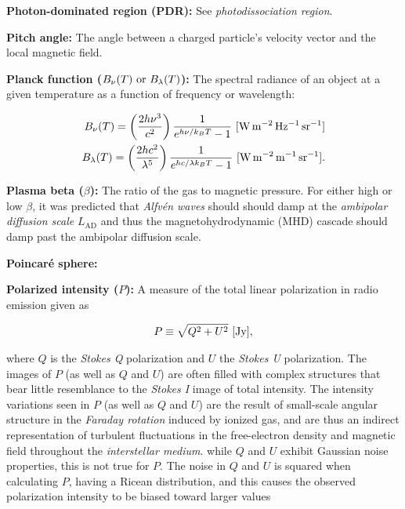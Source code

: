 \documentclass[a4paper,10pt]{article}
\begin{document}
{\noindent}\textbf{Photon-dominated region (PDR):} See \textit{photodissociation region}.

{\noindent}\textbf{Pitch angle:} The angle between a charged particle's velocity vector and the local magnetic field.

{\noindent}\textbf{Planck function ($B_\nu(T)~{\rm or}~B_\lambda(T)$):} The spectral radiance of an object at a given temperature as a function of frequency or wavelength:

\begin{align*}
    B_\nu(T) = \left(\frac{2h\nu^3}{c^2}\right) \frac{1}{e^{h\nu/k_BT}-1} ~ [{\rm W\,m^{-2}\,Hz^{-1}\,sr^{-1}}] \\
    B_\lambda(T) = \left(\frac{2hc^2}{\lambda^5}\right) \frac{1}{e^{hc/\lambda k_BT}-1} ~ [{\rm W\,m^{-2}\,m^{-1}\,sr^{-1}}].
\end{align*}

{\noindent}\textbf{Plasma beta ($\beta$):} The ratio of the gas to magnetic pressure. For either high or low $\beta$, it was predicted that \textit{Alfv\'en waves} should should damp at the \textit{ambipolar diffusion scale} $L_\mathrm{AD}$ and thus the magnetohydrodynamic (MHD) cascade should damp past the ambipolar diffusion scale.

{\noindent}\textbf{Poincar\'e sphere:}

{\noindent}\textbf{Polarized intensity ($P$):} A measure of the total linear polarization in radio emission given as

\begin{align*}
    P\equiv\sqrt{Q^2+U^2} ~ [{\rm Jy}],
\end{align*}

{\noindent}where $Q$ is the \textit{Stokes Q} polarization and $U$ the \textit{Stokes U} polarization. The images of $P$ (as well as $Q$ and $U$) are often filled with complex structures that bear little resemblance to the \textit{Stokes I} image of total intensity. The intensity variations seen in $P$ (as well as $Q$ and $U$) are the result of small-scale angular structure in the \textit{Faraday rotation} induced by ionized gas, and are thus an indirect representation of turbulent fluctuations in the free-electron density and magnetic field throughout the \textit{interstellar medium}. while $Q$ and $U$ exhibit Gaussian noise properties, this is not true for $P$. The noise in $Q$ and $U$ is squared when calculating $P$, having a Ricean distribution, and this causes the observed polarization intensity to be biased toward larger values
\end{document}
